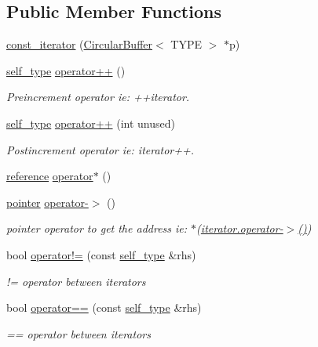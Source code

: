 \subsection*{Public Member Functions}
\begin{DoxyCompactItemize}
\item 
\hyperlink{classCircularBuffer_1_1const__iterator_a7d45dc75f949941d8fae14e9cab76250}{const\+\_\+iterator} (\hyperlink{classCircularBuffer}{Circular\+Buffer}$<$ T\+Y\+PE $>$ $\ast$p)
\item 
\hyperlink{classCircularBuffer_1_1const__iterator_a41a9fc607fc6af770334044799fdbe6b}{self\+\_\+type} \hyperlink{classCircularBuffer_1_1const__iterator_ac3912180eebed1b9c2a63af47e3c8e68}{operator++} ()
\begin{DoxyCompactList}\small\item\em Preincrement operator ie\+: ++iterator. \end{DoxyCompactList}\item 
\hyperlink{classCircularBuffer_1_1const__iterator_a41a9fc607fc6af770334044799fdbe6b}{self\+\_\+type} \hyperlink{classCircularBuffer_1_1const__iterator_aa7a4f392f1d2ef6ab788650d23020ef4}{operator++} (int unused)
\begin{DoxyCompactList}\small\item\em Postincrement operator ie\+: iterator++. \end{DoxyCompactList}\item 
\hyperlink{classCircularBuffer_1_1const__iterator_a5e8717f5d13ea32a69b990ac7aa9d863}{reference} \hyperlink{classCircularBuffer_1_1const__iterator_ae00a8d0a49238e2a5029728a9887d68b}{operator$\ast$} ()
\item 
\hyperlink{classCircularBuffer_1_1const__iterator_a037695795b1f705608755121fc938200}{pointer} \hyperlink{classCircularBuffer_1_1const__iterator_a77afc2800b3f756785ed1c33c0489408}{operator-\/$>$} ()
\begin{DoxyCompactList}\small\item\em pointer operator to get the address ie\+: $\ast$(\hyperlink{classCircularBuffer_1_1iterator_a158958ab9785710e115f626c8344f51d}{iterator.\+operator-\/$>$()}) \end{DoxyCompactList}\item 
bool \hyperlink{classCircularBuffer_1_1const__iterator_a8f3b413fbe0d3c704a92e829ee0c5a57}{operator!=} (const \hyperlink{classCircularBuffer_1_1const__iterator_a41a9fc607fc6af770334044799fdbe6b}{self\+\_\+type} \&rhs)
\begin{DoxyCompactList}\small\item\em != operator between iterators \end{DoxyCompactList}\item 
bool \hyperlink{classCircularBuffer_1_1const__iterator_ae4c06215d7d78a4399012af792a326e6}{operator==} (const \hyperlink{classCircularBuffer_1_1const__iterator_a41a9fc607fc6af770334044799fdbe6b}{self\+\_\+type} \&rhs)
\begin{DoxyCompactList}\small\item\em == operator between iterators \end{DoxyCompactList}\end{DoxyCompactItemize}


